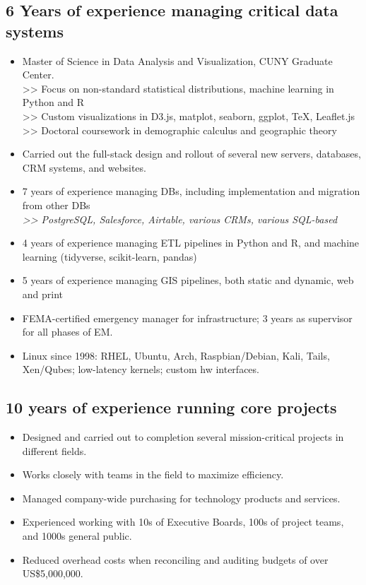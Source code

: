 \documentclass[]{deedy-resume-openfont}
\begin{document}
\subsection{6 Years of experience managing critical data systems}
\vspace{\topsep}
    \begin{itemize}
        \item Master of Science in Data Analysis and Visualization, CUNY Graduate Center. \\
        >> Focus on non-standard statistical distributions, machine learning in Python and R \\
        >> Custom visualizations in D3.js, matplot, seaborn, ggplot, \TeX, Leaflet.js \\
        >> Doctoral coursework in demographic calculus and geographic theory
        \item Carried out the full-stack design and rollout of several new servers, databases, CRM systems, and websites.
        \item 7 years of experience managing DBs, including implementation and migration from other DBs \\ \textit{>> PostgreSQL, Salesforce, Airtable, various CRMs, various SQL-based}
        \item 4 years of experience managing ETL pipelines in Python and R, and machine learning (tidyverse, scikit-learn, pandas)
        \item 5 years of experience managing GIS pipelines, both static and dynamic, web and print
        \item FEMA-certified emergency manager for infrastructure; 3 years as supervisor for all phases of EM.
        \item Linux since 1998: RHEL, Ubuntu, Arch, Raspbian/Debian, Kali, Tails, Xen/Qubes; low-latency kernels; custom hw interfaces.
    \end{itemize}
\subsection{10 years of experience running core projects}
\vspace{\topsep}
    \begin{itemize} 
    	\item Designed and carried out to completion several mission-critical projects in different fields.
        \item Works closely with teams in the field to maximize efficiency.
        \item Managed company-wide purchasing for technology products and services.
        \item Experienced working with 10s of Executive Boards, 100s of project teams, and 1000s general public.
        \item Reduced overhead costs when reconciling and auditing budgets of over US\$5,000,000.
	\end{itemize}
\end{document}
